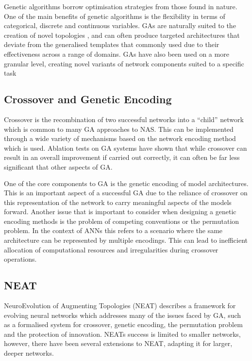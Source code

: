 \documentclass{article}
\begin{document}
	Genetic algorithms borrow optimisation strategies from those found in nature. One of the main benefits of genetic algorithms is the flexibility in terms of categorical, discrete and continuous variables. GAs are naturally suited to the creation of novel topologies\cite{24} \cite{25}, and can often produce targeted architectures that deviate from the generalised templates that commonly used due to their effectiveness across a range of domains. GAs have also been used on a more granular level, creating novel variants of network components suited to a specific task \cite{25}


	\subsection{Crossover and Genetic Encoding}

		Crossover is the recombination of two successful networks into a “child” network which is common to many GA approaches to NAS. \cite{3}\cite{24}\cite{5} This can be implemented through a wide variety of mechanisms based on the network encoding method which is used. Ablation tests on GA systems have shown that while crossover can result in an overall improvement if carried out correctly, it can often be far less significant that other aspects of GA. \cite{5}\cite{24}

		\par

		One of the core components to GA is the genetic encoding of model architectures. This is an important aspect of a successful GA due to the reliance of crossover on this representation of the network to carry meaningful aspects of the models forward. \cite{24} Another issue that is important to consider when designing a genetic encoding methods is the problem of competing conventions or the permutation problem\cite{38}\cite{24}. In the context of ANNs this refers to a scenario where the same architecture can be represented by multiple encodings. This can lead to inefficient allocation of computational resources and irregularities during crossover operations. \cite{24}


	\subsection{NEAT}


		NeuroEvolution of Augmenting Topologies (NEAT) \cite{24} describes a framework for evolving neural networks which addresses many of the issues faced by GA, such as a formalised system for crossover, genetic encoding, the permutation problem and the protection of innovation. NEATs success is limited to smaller networks, however, there have been several extensions to NEAT, adapting it for larger, deeper networks. \cite{44}\cite{25}
\end{document}
